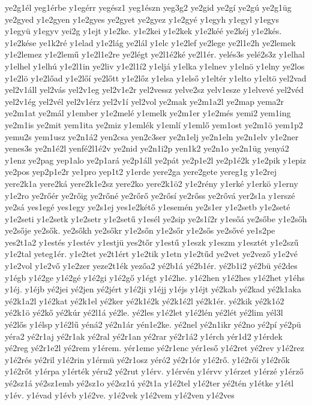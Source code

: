 {ye2g1él
yeg1érbe
y1egérr
yegész1
yeg1észn
yeg3g2
ye2gid
ye2gí
ye2gú
ye2g1üg
ye2gyed
y1e2gyen
y1e2gyes
ye2gyet
ye2gyez
y1e2gyé
y1egyh
y1egyl
y1egys
y1együ
y1egyv
yei2g
y1ejt
y1e2ke.
y1e2kei
y1e2kek
y1e2kéé
ye2kéj
y1e2kés.
y1e2kése
ye1k2ré
y1elad
y1e2lág
ye2lál
y1elc
y1e2lef
ye2lege
ye2l1e2h
ye2lemek
y1e2lemez
y1e2lemű
y1e2l1e2re
ye2légt
ye2l1é2ké
ye2l1ér.
yelés3s
yelé2s3z
y1elhal
y1elhel
y1elhú
y1e2l1in
ye2liv
y1e2l1í2
y1eljá
y1elka
y1elnev
y1elnö
y1elny
ye2los
y1e2lö
y1e2lőad
y1e2lőí
ye2lőtt
y1e2lőz
y1elsa
y1első
y1eltér
y1elto
y1eltö
yel2vad
yel2v1áll
yel2vás
yel2v1eg
yel2v1e2r
yel2vessz
yelve2sz
yelv1esze
y1elvevé
yel2véd
yel2v1ég
yel2vél
yel2v1érz
yel2v1í
yel2vol
ye2mak
ye2m1a2l
ye2map
yema2r
ye2m1at
ye2mál
y1ember
y1e2melé
y1emelk
ye2m1er
y1e2més
yemi2
yem1ing
ye2m1is
ye2mit
yem1ita
ye2miz
y1emlék
y1emlí
y1emlő
yem1ost
ye2m1ö
yem1p2
yemu2s
yem1usz
ye2n1á2
yen2csa
yen2c3ser
ye2n1elj
ye2n1eln
ye2n1elv
y1e2ner
yenes3s
ye2n1é2l
yenfé2l1é2v
ye2nid
ye2n1i2p
yen1k2
ye2n1o
ye2n1üg
yenyá2
y1enz
ye2pag
yep1alo
ye2p1ará
ye2p1áll
ye2pát
ye2p1e2l
ye2p1é2k
y1e2pik
y1epiz
ye2pos
yep2p1e2r
ye1pro
yep1t2
y1erde
yere2ga
yere2gete
yereg1g
y1e2rej
yere2k1a
yere2ká
yere2k1e2sz
yere2ko
yere2k1ö2
y1e2rény
y1erké
y1erkö
y1erny
y1e2ro
ye2rőér
ye2rőig
ye2rőné
ye2rőrő
ye2rősí
ye2rőss
ye2rővá
yer2s1a
y1erszé
ye2sá
yes1egé
yes1egy
ye2s1ej
yes1e2kétő
y1esemén
ye2s1er
y1e2setb
y1e2seté
y1e2seti
y1e2setk
y1e2setr
y1e2setű
y1esél
ye2sip
ye2s1í2r
y1esőá
ye2sőbe
y1e2sőh
ye2sője
ye2sők.
ye2sőkh
ye2sőkr
y1e2sőn
y1e2sőr
y1e2sős
ye2sővé
ye1s2pe
yes2t1a2
y1estés
y1estév
y1estjü
yes2tőr
y1estű
y1eszk
y1eszm
y1esztét
y1e2szű
y1e2tal
yeteg1ér.
y1e2tet
ye2t1ért
y1e2tik
y1etn
y1e2tűd
ye2vet
ye2vező
y1e2vé
y1e2vol
y1e2vő
y1e2zer
yeze2t1ék
yezőa2
yé2b1á
yé2b1ér.
yé2b1i2
yé2bü
yé2des
y1égb
y1é2ge
y1é2gé
y1é2gi
y1é2gő
y1égt
y1é2he.
y1é2hen
y1é2hes
y1é2het
y1éhs
y1éj.
y1éjb
yé2jei
yé2jen
yé2jért
y1é2ji
y1éjj
y1éjs
y1éjt
yé2kab
yé2kad
yé2k1aka
yé2k1a2l
y1é2kat
yé2k1el
yé2ker
yé2k1é2k
yé2k1é2l
yé2k1ér.
yé2kik
yé2k1ó2
yé2k1ö
yé2kő
yé2kúr
yé2l1á
yé2le.
yé2les
y1é2let
y1é2lén
yé2lét
yé2lim
yél3l
yé2lős
y1élsp
y1é2lű
yéná2
yé2n1ár
yén1e2ke.
yé2nel
yé2n1ikr
yé2no
yé2pí
yé2pü
yéra2
yé2r1aj
yé2r1ak
yé2ral
yé2r1an
yé2rar
yé2r1á2
y1érch
yér1d2
y1érdek
yé2reg
yé2r1e2l
yé2rem
y1érem.
yér1eme
yé2r1enc
yér1eső
y1é2ret
yé2rev
y1é2rez
y1é2rés
yé2ril
y1é2rin
y1érmü
yé2r1osz
yéró2
yé2r1ór
y1é2rő.
y1é2rői
y1é2rők
y1é2rőt
y1érpa
y1érték
yéru2
yé2rut
y1érv.
y1érvén
y1érvv
y1érzet
y1érzé
y1érző
yé2sz1á
yé2sz1emb
yé2sz1o
yé2sz1ú
yé2t1a
y1é2tel
y1é2ter
yé2tén
y1étke
y1étl
y1év.
y1évad
y1évb
y1é2ve.
y1é2vek
y1é2vem
y1é2ven
y1é2ves
}

